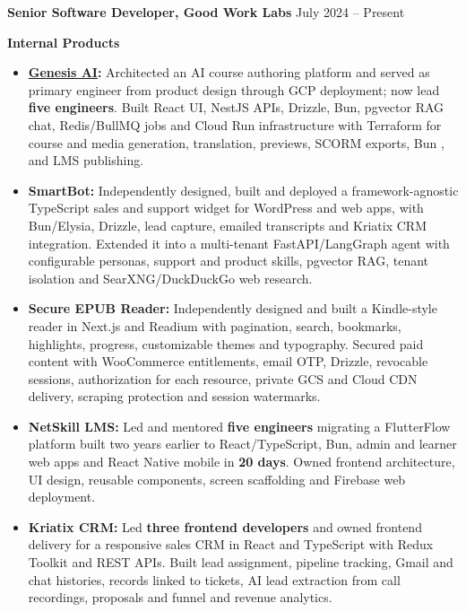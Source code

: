 \documentclass[letterpaper,10pt]{article}
\newcommand{\job}[2]{%
    \par\addvspace{2.5pt}%
    \Needspace{3\baselineskip}%
    \textbf{#1}\hfill
    {\fontsize{9.2pt}{10pt}\selectfont #2}\par
  }
\newcommand{\workgroup}[1]{%
    \par\addvspace{1.5pt}%
    \Needspace{2\baselineskip}%
    {\fontsize{9.4pt}{10.2pt}\selectfont\bfseries #1\par}%
  }
\begin{document}
  \job{Senior Software Developer, Good Work Labs}{July 2024 -- Present}

  \workgroup{Internal Products}

  \begin{itemize}
    \item \textbf{\href{https://www.netskill.com/genesis/}{Genesis AI}:}
    Architected an AI course authoring platform and served as primary
    engineer from product design through GCP deployment; now lead
    \textbf{five engineers}. Built React UI, NestJS APIs, Drizzle, Bun, pgvector RAG chat,
    Redis/BullMQ jobs and Cloud Run infrastructure with Terraform for
    course and media generation, translation, previews, SCORM exports, Bun ,
    and LMS publishing.

    \item \textbf{SmartBot:}
    Independently designed, built and deployed a framework-agnostic
    TypeScript sales and support widget for WordPress and web apps, with
    Bun/Elysia, Drizzle, lead capture, emailed transcripts and Kriatix CRM integration.
    Extended it into a multi-tenant FastAPI/LangGraph agent with configurable
    personas, support and product skills, pgvector RAG, tenant isolation
    and SearXNG/DuckDuckGo web research.

    \item \textbf{Secure EPUB Reader:}
    Independently designed and built a Kindle-style reader in Next.js and
    Readium with pagination, search, bookmarks, highlights, progress,
    customizable themes and typography. Secured paid content with
    WooCommerce entitlements, email OTP, Drizzle, revocable sessions, authorization
    for each resource, private GCS and Cloud CDN delivery, scraping
    protection and session watermarks.

    \item \textbf{NetSkill LMS:}
    Led and mentored \textbf{five engineers} migrating a FlutterFlow
    platform built two years earlier to React/TypeScript, Bun, admin and learner
    web apps and React Native mobile in \textbf{20 days}. Owned frontend
    architecture, UI design, reusable components, screen scaffolding
    and Firebase web deployment.

    \item \textbf{Kriatix CRM:}
    Led \textbf{three frontend developers} and owned frontend delivery for
    a responsive sales CRM in React and TypeScript with Redux Toolkit and
    REST APIs. Built lead assignment, pipeline tracking, Gmail and chat
    histories, records linked to tickets, AI lead extraction from call
    recordings, proposals and funnel and revenue analytics.
  \end{itemize}
\end{document}
